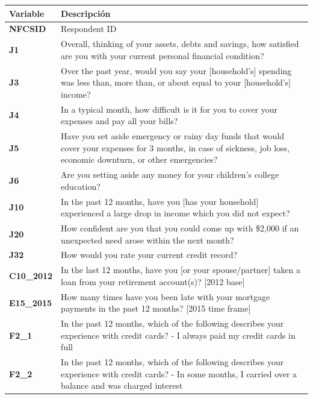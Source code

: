 \documentclass[a4paper, 11pt]{article}
\begin{document}
\begin{table}
\centering
\footnotesize
\begin{tabular}{>{\RaggedRight\hspace{0pt}}m{1.5cm} >{\RaggedRight\hspace{0pt}}m{11cm}}

\toprule
\textbf{Variable} & \textbf{Descripción}\\
\midrule

\textbf{NFCSID} & Respondent ID \\
\textbf{J1} & Overall, thinking of your assets, debts and savings, how satisfied are you with your current personal financial condition?  \\
\textbf{J3} & Over the past year, would you say your [household's] spending was less than, more than, or about equal to your [household's] income?  \\
\textbf{J4} & In a typical month, how difficult is it for you to cover your expenses and pay all your bills?  \\
\textbf{J5} & Have you set aside emergency or rainy day funds that would cover your expenses for 3 months, in case of sickness, job loss, economic downturn, or other emergencies?  \\
\textbf{J6} & Are you setting aside any money for your children's college education?\\
\textbf{J10} & In the past 12 months, have you [has your household] experienced a large drop in income which you did not expect? \\
\textbf{J20} & How confident are you that you could come up with \$2,000 if an unexpected need arose within the next month?  \\
\textbf{J32} & How would you rate your current credit record? \\
\textbf{C10\_2012} & In the last 12 months, have you [or your spouse/partner] taken a loan from your retirement account(s)? [2012 base]  \\
\textbf{E15\_2015} & How many times have you been late with your mortgage payments in the past 12 months? [2015 time frame]  \\
\textbf{F2\_1} & In the past 12 months, which of the following describes your experience with credit cards? - I always paid my credit cards in full  \\
\textbf{F2\_2} & In the past 12 months, which of the following describes your experience with credit cards? - In some months, I carried over a balance and was charged interest \\

\end{tabular}
\end{table}
\end{document}
